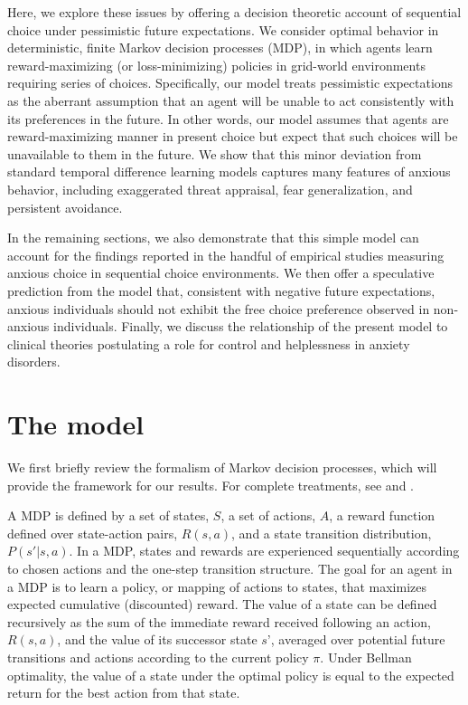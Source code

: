 \documentclass[11pt]{article} %
\begin{document}
Here, we explore these issues by offering a decision theoretic account of sequential choice under pessimistic future expectations. We consider optimal behavior in deterministic, finite Markov decision processes (MDP), in which agents learn reward-maximizing (or loss-minimizing) policies in grid-world environments requiring series of choices. Specifically, our model treats pessimistic expectations as the aberrant assumption that an agent will be unable to act consistently with its preferences in the future. In other words, our model assumes that agents are reward-maximizing manner in present choice but expect that such choices will be unavailable to them in the future. We show that this minor deviation from standard temporal difference learning models captures many features of anxious behavior, including exaggerated threat appraisal, fear generalization, and persistent avoidance.

In the remaining sections, we also demonstrate that this simple model can account for the findings reported in the handful of empirical studies measuring anxious choice in sequential choice environments. We then offer a speculative prediction from the model that, consistent with negative future expectations, anxious individuals should not exhibit the free choice preference observed in non-anxious individuals. Finally, we discuss the relationship of the present model to clinical theories postulating a role for control and helplessness in anxiety disorders.

\section{The model}

We first briefly review the formalism of Markov decision processes, which will provide the framework for our results. For complete treatments, see \cite{SuttonBarto1998, SuttonBarto2018} and \cite{bertsekas2005}.

A MDP is defined by a set of states, $S$, a set of actions, $A$, a reward function defined over state-action pairs, $R(s,a)$, and a state transition distribution, $P(s'|s,a)$. In a MDP, states and rewards are experienced sequentially according to chosen actions and the one-step transition structure. The goal for an agent in a MDP is to learn a policy, or mapping of actions to states, that maximizes expected cumulative (discounted) reward. The value of a state can be defined recursively as the sum of the immediate reward received following an action, $R(s, a)$, and the value of its successor state $s’$, averaged over potential future transitions and actions according to the current policy $\pi$. Under Bellman optimality, the value of a state under the optimal policy is equal to the expected return for the best action from that state.
\end{document}
